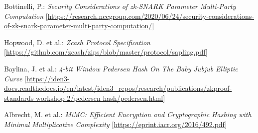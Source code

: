 \documentclass[a4paper]{article}
\begin{document}
\begin{thebibliography}{9}
Bottinelli, P.: \textit{Security Considerations of zk-SNARK Parameter Multi-Party Computation} [\url{https://research.nccgroup.com/2020/06/24/security-considerations-of-zk-snark-parameter-multi-party-computation/}]

Hopwood, D. et al.: \textit{Zcash Protocol Specification} [\url{https://github.com/zcash/zips/blob/master/protocol/sapling.pdf}]

Baylina, J. et al.: \textit{4-bit Window Pedersen Hash On The Baby Jubjub Elliptic Curve} [\url{https://iden3-docs.readthedocs.io/en/latest/iden3_repos/research/publications/zkproof-standards-workshop-2/pedersen-hash/pedersen.html}]

Albrecht, M. et al.: \textit{MiMC: Efficient Encryption and Cryptographic Hashing with Minimal Multiplicative Complexity} [\url{https://eprint.iacr.org/2016/492.pdf}]

\end{thebibliography}
\end{document}

